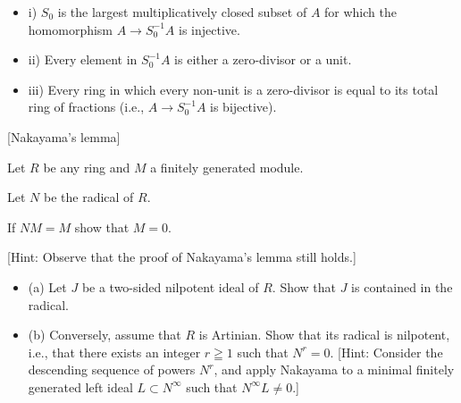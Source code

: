 \begin{itemize}
    \item i) $S_0$ is the largest multiplicatively closed subset of $A$ for which the homomorphism $A \rightarrow S_0^{-1} A$ is injective.

    \item ii) Every element in $S_0^{-1} A$ is either a zero-divisor or a unit.

    \item iii) Every ring in which every non-unit is a zero-divisor is equal to its total ring of fractions (i.e., $A \rightarrow S_0^{-1} A$ is bijective).
\end{itemize}

[Nakayama's lemma]

Let $R$ be any ring and $M$ a finitely generated module.

Let $N$ be the radical of $R$.

If $N M=M$ show that $M=0$.

[Hint: Observe that the proof of Nakayama's lemma still holds.]

\begin{itemize}
    \item (a) Let $J$ be a two-sided nilpotent ideal of $R$. Show that $J$ is contained in the radical.
    \item (b) Conversely, assume that $R$ is Artinian. Show that its radical is nilpotent, i.e., that there exists an integer $r \geqq 1$ such that $N^r=0$. [Hint: Consider the descending sequence of powers $N^r$, and apply Nakayama to a minimal finitely generated left ideal $L \subset N^{\infty}$ such that $N^{\infty} L \neq 0$.]
\end{itemize}
